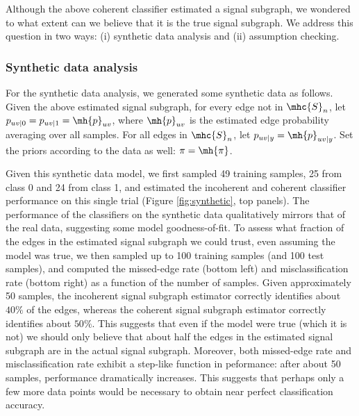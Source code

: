 \documentclass[10pt,journal,cspaper,compsoc]{IEEEtran}
\begin{document}
Although the above coherent classifier estimated a signal subgraph, we wondered to what extent can we believe that it is the true signal subgraph.  We address this question in two ways:  (i) synthetic data analysis and (ii) assumption checking.  

\subsubsection{Synthetic data analysis} %
\label{ssub:synthetic_data_analysis}

For the synthetic data analysis, we generated some synthetic data as follows.  Given the above estimated signal subgraph, for every edge not in $\mhc{S}_{n}$, let $p_{uv|0}=p_{uv|1}=\mh{p}_{uv}$, where $\mh{p}_{uv}$ is the estimated edge probability averaging over all samples.  For all edges in $\mhc{S}_{n}$, let $p_{uv|y}=\mh{p}_{uv|y}$.  Set the priors according to the data as well: $\pi=\mh{\pi}$.  

Given this synthetic data model, we first sampled 49 training samples, 25 from class 0 and 24 from class 1, and estimated the incoherent and coherent classifier performance on this single trial (Figure \ref{fig:synthetic}, top panels).  The performance of the classifiers on the synthetic data qualitatively mirrors that of the real data, suggesting some model goodness-of-fit.  To assess what fraction of the edges in the estimated signal subgraph we could trust, even assuming the model was true, we then sampled up to 100 training samples (and 100 test samples), and computed the missed-edge rate (bottom left) and misclassification rate (bottom right) as a function of the number of samples.  Given approximately 50 samples, the incoherent signal subgraph estimator correctly identifies about $40\%$ of the edges, whereas the coherent signal subgraph estimator correctly identifies about $50\%$.  This suggests that even if the model were true (which it is not) we should only believe that about half the edges in the estimated signal subgraph are in the actual signal subgraph.  Moreover, both missed-edge rate and misclassification rate exhibit a step-like function in peformance: after about 50 samples, performance dramatically increases.  This suggests that perhaps only a few more data points would be necessary to obtain near perfect classification accuracy.  
\end{document}
